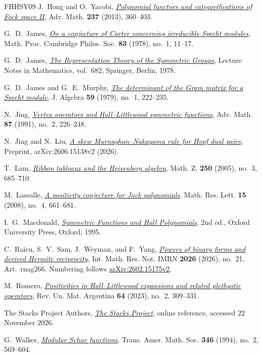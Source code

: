 \documentclass[12pt,reqno,a4paper]{amsart}
\numberwithin{equation}{section}
\numberwithin{figure}{section}
\theoremstyle{plain}
\theoremstyle{definition}
\begin{document}
\begin{thebibliography}{FHHSY09}
J.~Hong and O.~Yacobi,
\emph{\href{https://doi.org/10.1016/j.aim.2013.01.004}{Polynomial functors and categorifications of Fock space II}},
Adv. Math. \textbf{237} (2013), 360--403.

G.~D.~James,
\emph{\href{https://doi.org/10.1017/S0305004100054232}{On a conjecture of Carter concerning irreducible Specht modules}},
Math. Proc. Cambridge Philos. Soc. \textbf{83} (1978), no.~1, 11--17.

G.~D.~James,
\emph{\href{https://doi.org/10.1007/BFb0067708}{The Representation Theory of the Symmetric Groups}},
Lecture Notes in Mathematics, vol.~682, Springer, Berlin, 1978.

G.~D.~James and G.~E.~Murphy,
\emph{\href{https://doi.org/10.1016/0021-8693(79)90158-3}{The determinant of the Gram matrix for a Specht module}},
J. Algebra \textbf{59} (1979), no.~1, 222--235.

N.~Jing,
\emph{\href{https://doi.org/10.1016/0001-8708(91)90072-F}{Vertex operators and Hall--Littlewood symmetric functions}},
Adv. Math. \textbf{87} (1991), no.~2, 226--248.

N.~Jing and N.~Liu,
\emph{\href{https://arxiv.org/abs/2606.15138v2}{A skew Murnaghan--Nakayama rule for Hopf dual pairs}},
Preprint, arXiv:2606.15138v2 (2026).

T.~Lam,
\emph{\href{https://doi.org/10.1007/s00209-005-0771-3}{Ribbon tableaux and the Heisenberg algebra}},
Math. Z. \textbf{250} (2005), no.~3, 685--710.

M.~Lassalle,
\emph{\href{https://doi.org/10.4310/MRL.2008.v15.n4.a6}{A positivity conjecture for Jack polynomials}},
Math. Res. Lett. \textbf{15} (2008), no.~4, 661--681.

I.~G.~Macdonald,
\emph{\href{https://doi.org/10.1093/oso/9780198534891.001.0001}{Symmetric Functions and Hall Polynomials}}, 2nd ed.,
Oxford University Press, Oxford, 1995.

C.~Raicu, S.~V.~Sam, J.~Weyman, and F.~Yang,
\emph{\href{https://doi.org/10.1093/imrn/rnag266}{Powers of binary forms
and derived Hermite reciprocity}},
Int. Math. Res. Not. IMRN \textbf{2026} (2026), no.~21, Art.~rnag266.
Numbering follows \href{https://arxiv.org/abs/2602.15175v2}{arXiv:2602.15175v2}.

M.~Romero,
\emph{\href{https://doi.org/10.33044/revuma.2899}{Positivities in Hall--Littlewood expansions and related plethystic
operators}},
Rev. Un. Mat. Argentina \textbf{64} (2023), no.~2, 309--331.

The Stacks Project Authors,
\emph{\href{https://stacks.math.columbia.edu/}{The Stacks Project}},
online reference, accessed 22 November 2026.

G.~Walker,
\emph{\href{https://doi.org/10.1090/S0002-9947-1994-1273543-0}{Modular Schur functions}},
Trans. Amer. Math. Soc. \textbf{346} (1994), no.~2, 569--604.

\end{thebibliography}
\end{document}
